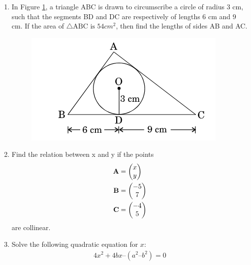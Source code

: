 \documentclass[journal,12pt,twocolumn]{IEEEtran}
\renewcommand\thesection{\arabic{section}}
\begin{document}
\begin{enumerate}[label=\thesection.\arabic*.,ref=\thesection.\theenumi]
\item In Figure \ref{Figure 4}, a triangle ABC is drawn to circumscribe a circle of radius $3$ cm, such that the segments BD and DC are respectively of lengths $6$ cm  and $9$ cm. If the area of $\triangle \text{ABC is }54 cm^2$, then find the lengths of sides AB and AC.
\begin{figure}[h!]
	\centering
    \includegraphics[width=0.8\columnwidth,center]{./figs/image4.png}
	\caption{}
	\label{Figure 4}
\end{figure}
\item Find the relation between x and y if the points 
\begin{align*}
\mathbf{A}&=\begin{pmatrix}x \\ y\end{pmatrix}\\ 
\mathbf{B}&=\begin{pmatrix}-5\\7\end{pmatrix}\\
\mathbf{C}&=\begin{pmatrix}-4\\5\end{pmatrix} 
\end{align*}
are collinear.
\item Solve the following quadratic equation for $x$:
 \begin{align*}
     4x^2 + 4bx – (a^2–b^2) = 0 
 \end{align*}
\end{enumerate}
\end{document}
